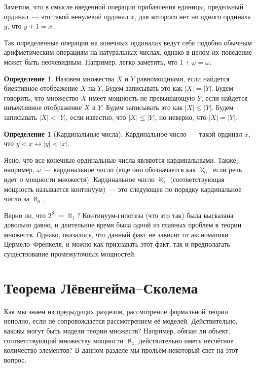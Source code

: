 \documentclass[a4paper,11pt]{article}
\theoremstyle{definition}
\newtheorem{dfn}[thm]{Определение}
\begin{document}
Заметим, что в смысле введенной операции прибавления единицы, предельный
ординал~--- это такой ненулевой ординал $x$, для которого нет ни одного
ординала $y$, что $y + 1 = x$.

Так определенные операции на конечных ординалах ведут себя подобно обычным
арифметическим операциям на натуральных числах, однако в целом их поведение
может быть неочевидным. Например, легко заметить, что $1 + \omega = \omega$.

\begin{dfn}
Назовем множества $X$ и $Y$ равномощными, если найдется биективное отображение
$X$ на $Y$. Будем записывать это как $|X| = |Y|$. Будем говорить, что множество
$X$ имеет мощность не превышающую $Y$, если найдется инъективное отображение $X$
в $Y$. Будем записывать это как $|X| \le |Y|$. Будем записывать $|X| < |Y|$,
если известно, что $|X| \le |Y|$, но неверно, что $|X| = |Y|$.
\end{dfn}

\begin{dfn}[Кардинальные числа]
Кардинальное число~--- такой ординал $x$, что $y < x \leftrightarrow |y| <
|x|$.
\end{dfn}

Ясно, что все конечные ординальные числа являются кардинальными. Также,
например, $\omega$~--- кардинальное число (еще оно обозначается как $\aleph_0$,
если речь идет о мощности множеств). Кардинальное число $\aleph_1$
(соответствующая мощность называется континуум)~--- это следующее по порядку
кардинальное число за $\aleph_0$.

Верно ли, что $2^{\aleph_0} = \aleph_1$? Континуум-гипотеза (что это так) была
высказана довольно давно, и длительное время была одной из главных проблем в
теории множеств. Однако, оказалось, что данный факт не зависит от аксиоматики
Цермело--Френкеля, и можно как признавать этот факт, так и предполагать
существование промежуточных мощностей.

\section{Теорема Лёвенгейма--Сколема}
Как мы знаем из предыдущих разделов, рассмотрение формальной теории неполно,
если не сопровождается рассмотрением её моделей. Действительно, каковы могут
быть модели теории множеств? Например, обязан ли объект, соответствующий
множеству мощности $\aleph_1$ действительно иметь несчётное количество
элементов? В данном разделе мы прольём некоторый свет на этот вопрос.
\end{document}
